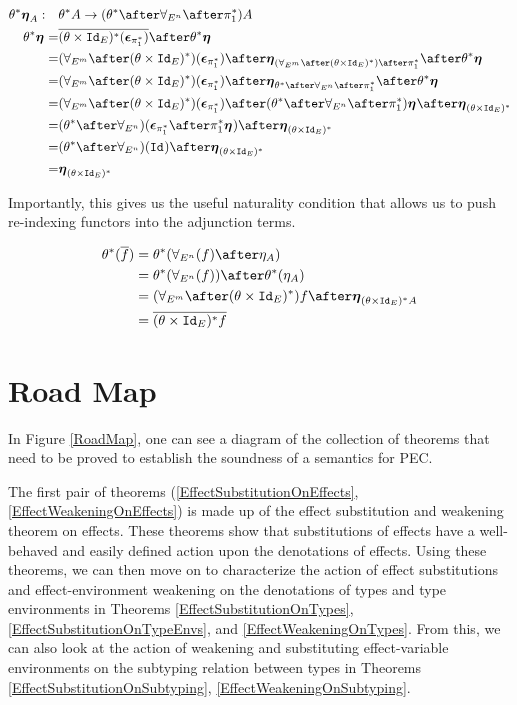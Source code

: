 \documentclass{Report}
\begin{document}
    \begin{align*}
        \theta\star\unit{A}:\quad&\theta\star A \rightarrow (\theta\star\after\allEn\after\pstar) A\\
        \theta\star\unit{} =& \bar{(\theta\times\Id{E})\star(\counit{\pstar})}\after\theta\star\unit{}\\
        =& (\allEm\after(\theta\times\Id{E})\star)(\counit{\pstar})\after\unit{(\allEm\after(\theta\times\Id{E})\star)\after\pstar}\after\theta\star\unit{}\\
        = & (\allEm\after(\theta\times\Id{E})\star)(\counit{\pstar})\after\unit{\theta\star\after\allEn\after\pstar}\after\theta\star\unit{}\\
        = & (\allEm\after(\theta\times\Id{E})\star)(\counit{\pstar}) \after(\theta\star\after\allEn\after\pstar)\unit{} \after\unit{(\theta\times\Id{E})\star}\\
        = & (\theta\star\after\allEn)(\counit{\pstar}
        \after\pstar\unit{})\after\unit{(\theta\times\Id{E})\star}\\
        = & (\theta\star\after\allEn)(\Id{})\after\unit{(\theta\times\Id{E})\star}\\
        = & \unit{(\theta\times\Id{E})\star}
    \end{align*}

    Importantly, this gives us the useful naturality condition that allows us to push re-indexing functors into the adjunction terms.

    \begin{align}\label{NaturalityCondition}
        \theta\star(\bar{f}) & = \theta\star(\allEn(f)\after\eta_A)\\
        & = \theta\star(\allEn(f))\after\theta\star(\eta_A)\\
        & =  (\allEm\after(\theta\times\Id{E})\star)f \after\unit{(\theta\times\Id{E})\star A}\\
        & = \bar{(\theta\times\Id{E})\star f}
    \end{align}

\section{Road Map}
In Figure \ref{RoadMap}, one can see a diagram of the collection of theorems that need to be proved to establish the soundness of a semantics for PEC.


The first pair of theorems (\ref{EffectSubstitutionOnEffects}, \ref{EffectWeakeningOnEffects}) is made up of the effect substitution and weakening theorem on effects. These theorems show that substitutions of effects have a well-behaved and easily defined action upon the denotations of effects. Using these theorems, we can then move on to characterize the action of effect substitutions and effect-environment weakening on the denotations of types and type environments in Theorems \ref{EffectSubstitutionOnTypes}, \ref{EffectSubstitutionOnTypeEnvs}, and \ref{EffectWeakeningOnTypes}. From this, we can also look at the action of weakening and substituting effect-variable environments on the subtyping relation between types in Theorems \ref{EffectSubstitutionOnSubtyping}, \ref{EffectWeakeningOnSubtyping}.
\end{document}
